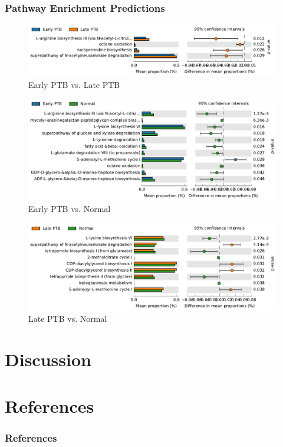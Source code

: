\documentclass{beamer}
\begin{document}
    \begin{frame}[allowframebreaks]
        \frametitle{Pathway Enrichment Predictions}

        \begin{figure}
            \includegraphics[width=0.9 \linewidth]{figures/PICRUSt2/EL.pdf}
            \caption{Early PTB vs. Late PTB}
        \end{figure}

        \begin{figure}
            \includegraphics[width=0.9 \linewidth]{figures/PICRUSt2/EF.pdf}
            \caption{Early PTB vs. Normal}
        \end{figure}

        \begin{figure}
            \includegraphics[width=0.9 \linewidth]{figures/PICRUSt2/LF.pdf}
            \caption{Late PTB vs. Normal}
        \end{figure}
    \end{frame}

    \section{Discussion}

    \section{References}
   	\begin{frame}[allowframebreaks]
        \frametitle{References}
        
        
    \end{frame}
\end{document}
